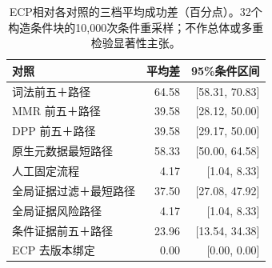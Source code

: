 \begin{table}[t]
\caption{ECP相对各对照的三档平均成功差（百分点）。32个构造条件块的10,000次条件重采样；不作总体或多重检验显著性主张。}\label{tab:network-effects}
\centering\small
\begin{tabularx}{\columnwidth}{Xrr}
\toprule
对照 & 平均差 & 95\%条件区间 \\
\midrule
词法前五＋路径 & 64.58 & [58.31, 70.83] \\
MMR 前五＋路径 & 39.58 & [28.12, 50.00] \\
DPP 前五＋路径 & 39.58 & [29.17, 50.00] \\
原生元数据最短路径 & 58.33 & [50.00, 64.58] \\
人工固定流程 & 4.17 & [1.04, 8.33] \\
全局证据过滤＋最短路径 & 37.50 & [27.08, 47.92] \\
全局证据风险路径 & 4.17 & [1.04, 8.33] \\
条件证据前五＋路径 & 23.96 & [13.54, 34.38] \\
ECP 去版本绑定 & 0.00 & [0.00, 0.00] \\
\bottomrule
\end{tabularx}
\end{table}
